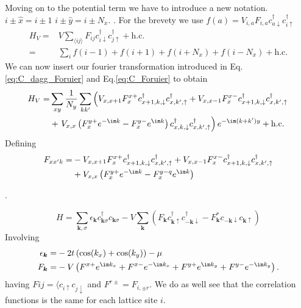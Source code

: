 \documentclass[../main.tex]{subfile}
\begin{document}
 Moving on to the potential term we have to introduce a new notation. $i\pm\hat{x} = i\pm 1$  $i\pm\hat{y} = i\pm N_x$. .
 For the brevety we use $f(a) = V_{i,a}F_{i,a} c^{\dagger}_{a\downarrow} c^{\dagger}_{i\uparrow}$
 \begin{align*}
     H_V =& V \sum_{\langle ij\rangle} F_{ij} c^{\dagger}_{i\downarrow} c^{\dagger}_{j\uparrow} + \text{h.c.} \\
     =& \sum_{i} f(i-1) + f(i+1) + f(i+N_x) + f(i-N_x) + \text{h.c.}
 \end{align*}
 We can now insert our fourier transformation introduced in Eq.\ref{eq:C_dagg_Foruier} and Eq.\ref{eq:C_Foruier} to obtain
 \begin{align*}
     H_V =& \sum_{xy} \frac{1}{N_y} \sum_{kk'} \left( V_{x,x+1} F_{x}^{x+} c^{\dagger}_{x+1,k,\downarrow}c^{\dagger}_{x,k',\uparrow} + V_{x,x-1} F_{x}^{x-} c^{\dagger}_{x+1,k,\downarrow} c^{\dagger}_{x,k',\uparrow} \right.\\
         &+ \left.V_{x,x}\left( F_{x}^{y+} e^{-\im k}  - F_{x}^{y-} e^{\im k}\right) c^{\dagger}_{x,k,\downarrow} c^{\dagger}_{x,k',\uparrow} \right) e^{-\im(k + k')y} + \text{h.c.}\\
 \end{align*}
 Defining 
 \begin{equation*}
     \begin{aligned}
     F_{xx'k} =& - V_{x,x+1} F_{x}^{x+} c^{\dagger}_{x+1,k,\downarrow}c^{\dagger}_{x,k',\uparrow} + V_{x,x-1} F_{x}^{x-} c^{\dagger}_{x+1,k,\downarrow} c^{\dagger}_{x,k',\uparrow} \\
         &+ V_{x,x}\left( F_{x}^{y+} e^{-\im k}  - F_{x}^{y-q} e^{\im k}\right)
     \end{aligned}
 \end{equation*} 

. 

\begin{equation*}
    H = \sum_{\bm{k},\sigma} \epsilon_{\bm{k}} c_{\bm{k}\sigma}^{\dagger} c_{\bm{k}\sigma} 
    - V \sum_{\bm{k}} \left( F_{\bm{k}} c^{\dagger}_{\bm{k}\uparrow} c^{\dagger}_{-\bm{k}\downarrow}
    - F_{\bm{k}}^{\ast} c_{-\bm{k}\downarrow} c_{\bm{k}\uparrow} \right)
\end{equation*}
Involving 
\begin{align*}
    \epsilon_{\bm{k}} =& -2t \left( \cos(k_x) + \cos(k_y) \right) - \mu\\
    F_{\bm{k}} =& - V \left(F^{x+} e^{\im k_x} + F^{x-}e^{-\im k_x} + F^{y+} e^{\im k_y} + F^{y-}e^{-\im k_y} \right). 
\end{align*}
having $F{ij} = \langle c_{i\uparrow} c_{j\downarrow}$ and $F^{r\pm} = F_{i, \pm r}$. We do as well see that the correlation functions is the same
for each lattice site $i$.\\
\end{document}
